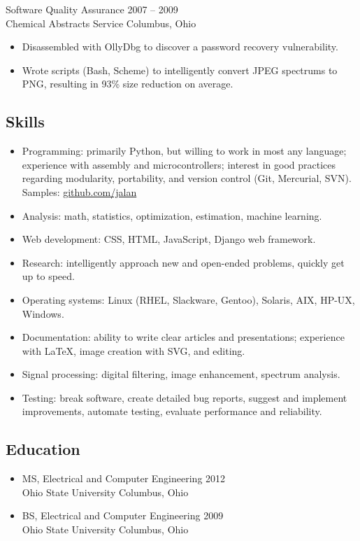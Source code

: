 \documentclass[12pt]{report}
\begin{document}
Software Quality Assurance                              \hfill 2007 -- 2009 \\
Chemical Abstracts Service                              \hfill Columbus, Ohio
\begin{itemize}
\item Disassembled with OllyDbg to discover a password recovery vulnerability.
\item Wrote scripts (Bash, Scheme) to intelligently convert JPEG spectrums to PNG, resulting in 93\% size reduction on average.
\end{itemize}

\subsection*{Skills}
\begin{itemize}
\item Programming: primarily Python, but willing to work in most any language; experience with assembly and microcontrollers; interest in good practices regarding modularity, portability, and version control (Git, Mercurial, SVN). Samples: \href{http://github.com/jalan}{github.com/jalan}
\item Analysis: math, statistics, optimization, estimation, machine learning.
\item Web development: CSS, HTML, JavaScript, Django web framework.
\item Research: intelligently approach new and open-ended problems, quickly get up to speed.
\item Operating systems: Linux (RHEL, Slackware, Gentoo), Solaris, AIX, HP-UX, Windows.
\item Documentation: ability to write clear articles and presentations; experience with \LaTeX, image creation with SVG, and editing.
\item Signal processing: digital filtering, image enhancement, spectrum analysis.
\item Testing: break software, create detailed bug reports, suggest and implement improvements, automate testing, evaluate performance and reliability.
\end{itemize}

\subsection*{Education}
\begin{itemize}
\item MS, Electrical and Computer Engineering \hfill 2012 \\
Ohio State University                         \hfill Columbus, Ohio \\

\item BS, Electrical and Computer Engineering \hfill 2009 \\
Ohio State University                         \hfill Columbus, Ohio \\
\end{itemize}
\end{document}
